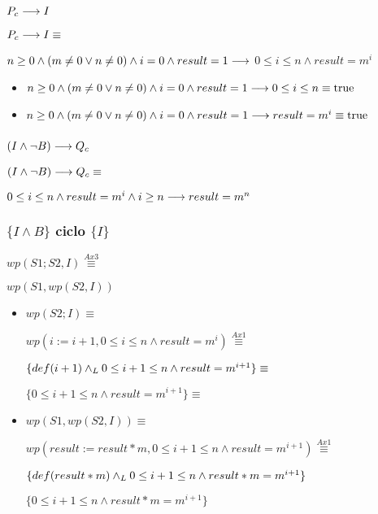 \documentclass{article}
\begin{document}
\subsubsection*{$P_{c} \longrightarrow I$}

$P_{c} \longrightarrow I \equiv$

$n \geq 0 \wedge (m \neq 0 \vee n \neq 0) \wedge i = 0 \wedge result = 1 \longrightarrow$
$0 \leq i \leq n \wedge result = m^{i}$

\begin{itemize}
    \item $n \geq 0 \wedge (m \neq 0 \vee n \neq 0) \wedge i = 0 \wedge result = 1 \longrightarrow 0 \leq i \leq n \equiv \mathrm{true}$
    \item $n \geq 0 \wedge (m \neq 0 \vee n \neq 0) \wedge i = 0 \wedge result = 1 \longrightarrow result = m^{i} \equiv \mathrm{true}$
\end{itemize}

\subsubsection*{$(I \wedge \neg B) \longrightarrow Q_{c}$}

$(I \wedge \neg B) \longrightarrow Q_{c} \equiv$

$0 \leq i \leq n \wedge result = m^{i} \wedge i \geq n \longrightarrow result = m^{n}$

\subsubsection*{$\{I \wedge B\}$ ciclo $\{ I \}$}

$wp(S1;S2, I) \stackrel{Ax3}{\equiv}$

$wp(S1, wp(S2, I))$

\begin{itemize}
    \item $wp(S2; I) \equiv$

    $wp(i:= i+1, 0 \leq i \leq n \wedge result = m^{i}) \stackrel{Ax1}{\equiv}$

    $\{def(i+1) \land _L 0 \leq i+1 \leq n \wedge result = m^{i+1}\} \equiv$

    $\{0 \leq i+1 \leq n \wedge result = m^{i+1}\} \equiv$

    \item $wp(S1, wp(S2, I)) \equiv$

    $wp(result:= result*m, 0 \leq i+1 \leq n \wedge result = m^{i+1}) \stackrel{Ax1}{\equiv}$

    $\{ def(result*m) \land _L 0 \leq i+1 \leq n \wedge result*m = m^{i+1} \}$

    $\{ 0 \leq i+1 \leq n \wedge result*m = m^{i+1} \}$

\end{itemize}
\end{document}
